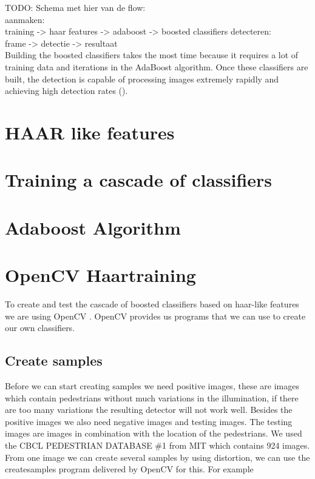 \documentclass{article}
\begin{document}
TODO: Schema met hier van de flow:\\
aanmaken:\\
training -> haar features -> adaboost -> boosted classifiers
detecteren:\\
frame -> detectie -> resultaat\\

Building the boosted classifiers takes the most time because it requires a lot of training data and iterations in the AdaBoost algorithm. Once these classifiers are built, the detection is capable of processing images
extremely rapidly and achieving high detection rates (\cite{viola2001rapid}).

\section{HAAR like features}


\section{Training a cascade of classifiers}

\section{Adaboost Algorithm}


\section{OpenCV Haartraining}
To create and test the cascade of boosted classifiers based on haar-like features we are using OpenCV \cite{opencv_library}. OpenCV provides us programs that we can use to create our own classifiers.

\subsection{Create samples}
Before we can start creating samples we need positive images, these are images which contain pedestrians without much variations in the illumination, if there are too many variations the resulting detector will not work well.
Besides the positive images we also need negative images and testing images. The testing images are images in combination with the location of the pedestrians. We used the CBCL PEDESTRIAN DATABASE \#1 from MIT which contains 924 images.
From one image we can create several samples by using distortion, we can use the createsamples program delivered by OpenCV for this. For example 
\end{document}
